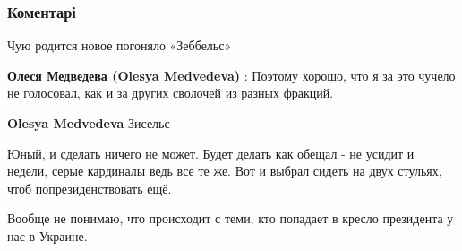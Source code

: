 \subsubsection{Коментарі}

\begin{itemize}
 
Чую родится новое погоняло «Зеббельс»

\begin{itemize}
 
\textbf{Олеся Медведева (Olesya Medvedeva)} : Поэтому хорошо, что я за это чучело не голосовал, как и за других сволочей из разных фракций.

 
\textbf{Olesya Medvedeva} Зисельс

\end{itemize}

 
Юный, и сделать ничего не может. Будет делать как обещал - не усидит и недели,
серые кардиналы ведь все те же. Вот и выбрал сидеть на двух стульях, чтоб
попрезиденствовать ещё.

 
Вообще не понимаю, что происходит с теми, кто попадает в кресло президента у нас в Украине.


\end{itemize}
